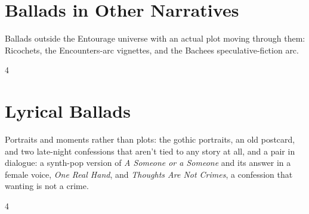 \documentclass[a4paper,landscape]{memoir}
\begin{document}
\chapter{Ballads in Other Narratives}
Ballads outside the Entourage universe with an actual plot moving through them: Ricochets, the Encounters-arc vignettes, and the Bachees speculative-fiction arc.
\clearpage\begin{multicols*}{4}
\end{multicols*}

\chapter{Lyrical Ballads}
Portraits and moments rather than plots: the gothic portraits, an old postcard, and two late-night confessions that aren't tied to any story at all, and a pair in dialogue: a synth-pop version of \emph{A Someone or a Someone} and its answer in a female voice, \emph{One Real Hand}, and \emph{Thoughts Are Not Crimes}, a confession that wanting is not a crime.
\clearpage\begin{multicols*}{4}
\end{multicols*}
\end{document}
